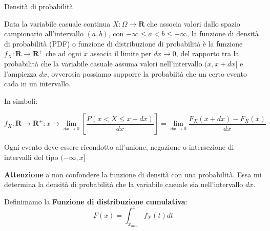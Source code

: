 \documentclass[openany,a4paper,12pt]{book}
\theoremstyle{remark}
\begin{document}
\begin{bressan}{Densità di probabilità}

 Data la variabile casuale continua \( X: \Omega \to \mathbf{R} \) che associa valori dallo spazio campionario all'intervallo 
 \((a, b)\), con \( -\infty \leq a < b \leq +\infty \), la funzione di densità di probabilità (PDF) o funzione di distribuzione di probabilità è 
 la funzione \( f_X: \mathbf{R} \to \mathbf{R}^+ \) che ad ogni \( x \) associa il limite per \( dx \rightarrow 0\), del rapporto tra la probabilità 
 che la variabile casuale assuma valori nell'intervallo \((x, x + dx]\) e l'ampiezza \( dx \), ovverosia possiamo supporre la probabiità che un certo 
 evento cada in un intervallo.

 In simboli:
 
 \[ f_X: \mathbf{R} \to \mathbf{R}^+ : x \mapsto \lim_{dx \to 0} \left[ \frac{P(x < X \leq x + dx)}{dx} \right] = \lim_{dx \to 0} \frac{F_X(x+dx)- F_X(x)}{dx}\]

 Ogni evento deve essere ricondotto all'unione, negazione o intersezione di intervalli del tipo $( -\infty, x] $

 \textbf{Attenzione} a non confondere la funzione di densità con una probabilità.
 Essa mi determina la densità di probabilità che la variabile casuale sia nell'intervallo $dx$.

 Definimamo la \textbf{Funzione di distribuzione cumulativa}:
 \[
 F(x)=\int_{x_{min}}^x f_X(t)dt
 \]


\begin{center}
\end{center}



\end{bressan}
\end{document}
